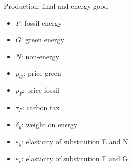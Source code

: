 \documentclass[11pt,aspectratio=169]{beamer}
\begin{document}
\begin{frame}{Production: final and energy good}
			\small
			\vspace{4mm}
			\hspace{-4mm}
			\begin{minipage}[t!]{0.23\textwidth}
				\vspace{0mm}
				\begin{itemize}	
					\item[]$F$: fossil energy
					\vspace{-2mm}	
					\item[]$G$: green energy
					\vspace{-7mm}	
					\item[]$N$: non-energy
				\end{itemize}
			\end{minipage}
			\begin{minipage}[t!]{0.22\textwidth}
				\vspace{0mm}
				\begin{itemize}
					\item[] $p_G$: price green  \vspace{-7mm}
					\item[] $p_F$: price fossil
					\vspace{-2mm}	
					\item[] $\tau_F$: carbon tax
				\end{itemize}
			\end{minipage}
			\begin{minipage}[t!]{0.55\textwidth}
				\vspace{0mm}
				\begin{itemize}
					\item[] $\delta_{y}$: weight on energy\vspace{-2mm}
					\item[] $\varepsilon_y$: elasticity of substitution E and N \vspace{-2mm}
					\item[] $\varepsilon_e$: elasticity of substitution F and G
				\end{itemize}
			\end{minipage}
		\end{frame}
		
\end{document}
